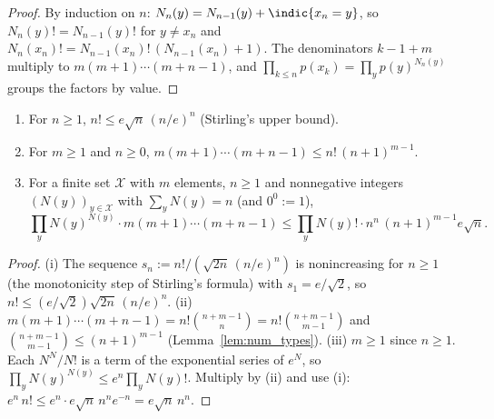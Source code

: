 \begin{proof}
\leanok
By induction on $n$: $N_n(y) = N_{n-1}(y) + \indic\{x_n = y\}$, so $N_n(y)! = N_{n-1}(y)!$ for
$y \ne x_n$ and $N_n(x_n)! = N_{n-1}(x_n)!\,(N_{n-1}(x_n) + 1)$. The denominators $k - 1 + m$
multiply to $m (m + 1) \cdots (m + n - 1)$, and $\prod_{k \le n} p(x_k) = \prod_y p(y)^{N_n(y)}$
groups the factors by value.
\end{proof}

\begin{lemma}\label{lem:emp_factorial_bounds}
\leanok
{}
\begin{enumerate}
  \item[(i)] For $n \ge 1$, $n! \le e \sqrt n\, (n/e)^n$ (Stirling's upper bound).
  \item[(ii)] For $m \ge 1$ and $n \ge 0$, $m (m + 1) \cdots (m + n - 1) \le n!\, (n + 1)^{m - 1}$.
  \item[(iii)] For a finite set $\mathcal X$ with $m$ elements, $n \ge 1$ and nonnegative integers
        $(N(y))_{y \in \mathcal X}$ with $\sum_y N(y) = n$ (and $0^0 := 1$),
        \[
          \prod_y N(y)^{N(y)} \cdot m (m + 1) \cdots (m + n - 1)
          \le \prod_y N(y)! \cdot n^n\, (n + 1)^{m - 1} e \sqrt n .
        \]
\end{enumerate}
\end{lemma}

\begin{proof}
\leanok
{}
(i) The sequence $s_n := n!/(\sqrt{2n}\,(n/e)^n)$ is nonincreasing for $n \ge 1$ (the monotonicity
step of Stirling's formula) with $s_1 = e/\sqrt 2$, so $n! \le (e/\sqrt 2) \sqrt{2n}\,(n/e)^n$.
(ii) $m (m + 1) \cdots (m + n - 1) = n! \binom{n + m - 1}{n} = n! \binom{n + m - 1}{m - 1}$ and
$\binom{n + m - 1}{m - 1} \le (n + 1)^{m - 1}$ (Lemma~\ref{lem:num_types}).
(iii) $m \ge 1$ since $n \ge 1$. Each $N^N/N!$ is a term of the exponential series of $e^N$, so
$\prod_y N(y)^{N(y)} \le e^n \prod_y N(y)!$. Multiply by (ii) and use (i):
$e^n\, n! \le e^n \cdot e \sqrt n\, n^n e^{-n} = e \sqrt n\, n^n$.
\end{proof}

